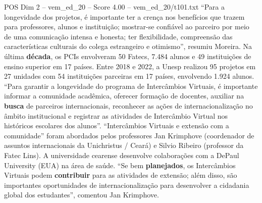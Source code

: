 \begin{textsample}{POS Dim 2 – vem\_ed\_20 – Score 4.00 – vem\_ed\_20/t101.txt}  \label{ex:f2_pos_101}
“Para a longevidade dos projetos, é importante ter a crença nos benefícios que trazem para professores, alunos e instituição; mostrar-se confiável ao parceiro por meio de uma comunicação intensa e honesta; ter flexibilidade, compreensão das características culturais do colega estrangeiro e otimismo”, resumiu Moreira.
Na última \textbf{década}, os PCIs envolveram 50 Fatecs, 7.484 alunos e 49 instituições de ensino superior em 17 países.
Entre 2018 e 2022, a Unesp realizou 95 projetos em 27 unidades com 54 instituições parceiras em 17 países, envolvendo 1.924 alunos. “Para garantir a longevidade do programa de Intercâmbios Virtuais, é importante informar a comunidade acadêmica, oferecer formação de docentes, auxiliar na \textbf{busca} de parceiros internacionais, reconhecer as ações de internacionalização no âmbito institucional e registrar as atividades de Intercâmbio Virtual nos históricos escolares dos alunos”. “Intercâmbios Virtuais e extensão com a comunidade” foram abordados pelos professores Jan Krimphove (coordenador de assuntos internacionais da Unichristus / Ceará) e Silvio Ribeiro (professor da Fatec Lins).
A universidade cearense desenvolve colaborações com a DePaul University (EUA) na área de saúde. “Se bem \textbf{planejados}, os Intercâmbios Virtuais podem \textbf{contribuir} para as atividades de extensão; além disso, são importantes oportunidades de internacionalização para desenvolver a cidadania global dos estudantes”, comentou Jan Krimphove.

\end{textsample}
